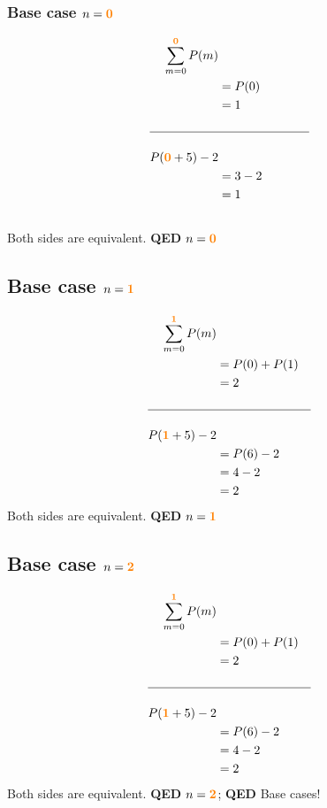 \documentclass[11pt]{article}
\def \subsorange [#1]{\mathbf{\textcolor{orange}{#1}}}
\begin{document}
\begin{table}[h]
   \begin{subtable}[h]{0.45\textwidth}
      \subsubsection*{Base case $n=\subsorange[0]$}
      \begin{alignat*}{2}
         \sum_{m=0}^{\subsorange[0]}P(m) \\
         &=P(0) &\phantom{+P(1)} \\
         &=1 \\
         \\ \hline \\
         P(\subsorange[0]+5)-2 \\
         &=3-2 \\
         &=1 \\
         &\phantom{=1}
      \end{alignat*}
      Both sides are equivalent. \textbf{QED} $n=\subsorange[0]$
   \end{subtable}
   \hfill
   \begin{subtable}[h]{0.45\textwidth}
      \subsection*{Base case $n=\subsorange[1]$}
      \begin{alignat*}{2}
         \sum_{m=0}^{\subsorange[1]}P(m) \\
         &=P(0)+P(1) \\
         &=2 \\
         \\ \hline \\
         P(\subsorange[1]+5)-2 \\
         &=P(6)-2 \\
         &=4-2 \\
         &=2
      \end{alignat*}
      Both sides are equivalent. \textbf{QED} $n=\subsorange[1]$
    \end{subtable}
\end{table}

\subsection*{Base case $n=\subsorange[2]$}
\begin{alignat*}{2}
   \sum_{m=0}^{\subsorange[1]}P(m) \\
   &=P(0)+P(1) \\
   &=2 \\
   \\ \hline \\
   P(\subsorange[1]+5)-2 \\
   &=P(6)-2 \\
   &=4-2 \\
   &=2
\end{alignat*}
Both sides are equivalent. \textbf{QED} $n=\subsorange[2]$; \textbf{QED} Base cases!
\end{document}
